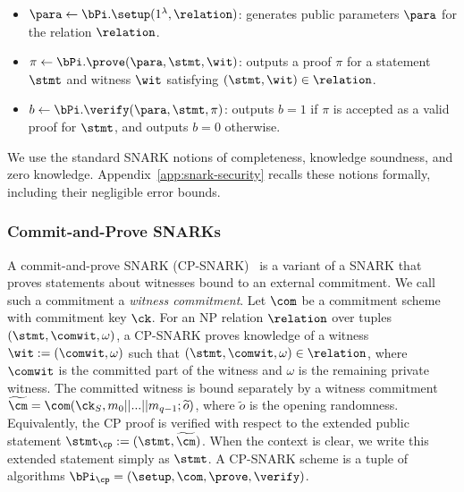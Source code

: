 \begin{itemize}
\item $\para \gets \bPi.\setup(1^\lambda,\relation)$:
generates public parameters $\para$ for the relation $\relation$.

\item $\pi \gets \bPi.\prove(\para,\stmt,\wit)$:
outputs a proof $\pi$ for a statement $\stmt$ and witness $\wit$ satisfying $(\stmt,\wit)\in\relation$.

\item $b \gets \bPi.\verify(\para,\stmt,\pi)$:
outputs $b=1$ if $\pi$ is accepted as a valid proof for $\stmt$, and outputs $b=0$ otherwise.
\end{itemize}

\begin{remark}
We use the standard SNARK notions of completeness, knowledge soundness, and
zero knowledge.  Appendix~\ref{app:snark-security} recalls these notions
formally, including their negligible error bounds. 
\end{remark}


\subsubsection{Commit-and-Prove SNARKs}
A commit-and-prove SNARK (CP-SNARK)~\cite{gnark, legosnark} is a variant of a SNARK that proves statements about witnesses bound to an external commitment. We call such a commitment a \emph{witness commitment}. Let $\com$ be a commitment scheme with commitment key $\ck$. For an NP relation $\relation$ over tuples $(\stmt,\comwit,\omega)$, a CP-SNARK proves knowledge of a witness
$\wit := (\comwit,\omega)$ such that $(\stmt,\comwit,\omega)\in\relation$,
where $\comwit$ is the committed part of the witness and $\omega$ is the
remaining private witness.  The committed witness is bound separately by a
witness commitment
$\widetilde{\cm} = \com(\ck_S, m_0 || ... || m_{q-1}; \widetilde{o})$, where $\tilde{o}$ is the
opening randomness.  Equivalently, the CP proof is verified with respect to the
extended public statement $\stmt_{\cp}:=(\stmt,\widetilde{\cm})$.  When the
context is clear, we write this extended statement simply as $\stmt$.
A CP-SNARK scheme is a tuple of algorithms
$\bPi_{\cp}=(\setup,\com,\prove,\verify)$.

